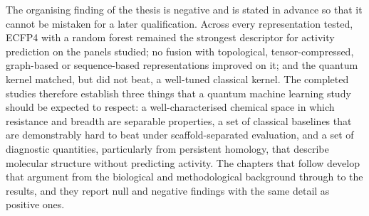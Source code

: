 The organising finding of the thesis is negative and is stated in advance so that it cannot be mistaken for a later qualification. Across every representation tested, ECFP4 with a random forest remained the strongest descriptor for activity prediction on the panels studied; no fusion with topological, tensor-compressed, graph-based or sequence-based representations improved on it; and the quantum kernel matched, but did not beat, a well-tuned classical kernel. The completed studies therefore establish three things that a quantum machine learning study should be expected to respect: a well-characterised chemical space in which resistance and breadth are separable properties, a set of classical baselines that are demonstrably hard to beat under scaffold-separated evaluation, and a set of diagnostic quantities, particularly from persistent homology, that describe molecular structure without predicting activity. The chapters that follow develop that argument from the biological and methodological background through to the results, and they report null and negative findings with the same detail as positive ones.